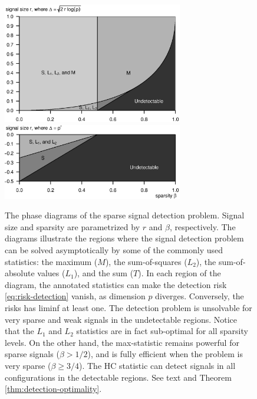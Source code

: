 \begin{figure}
      \centering
      \includegraphics[width=0.7\textwidth]{figures/phase_diagram_signal_detection.eps}
      \includegraphics[width=0.7\textwidth]{figures/phase_diagram_signal_detection_vanishing_signals.eps}
      \caption{The phase diagrams of the sparse signal detection problem. 
      Signal size and sparsity are parametrized by $r$ and $\beta$, respectively.
      The diagrams illustrate the regions where the signal detection problem can be solved asymptotically by some of the commonly used statistics: the maximum ($M$), the sum-of-squares ($L_2$), the sum-of-absolute values ($L_1$), and the sum ($T$).
      In each region of the diagram, the annotated statistics can make the detection risk \eqref{eq:risk-detection} vanish, as dimension $p$ diverges. Conversely, the risks has liminf at least one.
      The detection problem is unsolvable for very sparse and weak signals in the undetectable regions.
      Notice that the $L_1$ and $L_2$ statistics are in fact sub-optimal for all sparsity levels.
      On the other hand, the max-statistic remains powerful for sparse signals ($\beta>1/2$), and is fully efficient when the problem is very sparse ($\beta\ge3/4$).
      The \ac{HC} statistic can detect signals in all configurations in the detectable regions.
      See text and Theorem \ref{thm:detection-optimality}.}
      \label{fig:phase-diagram-signal-detection}
\end{figure}


